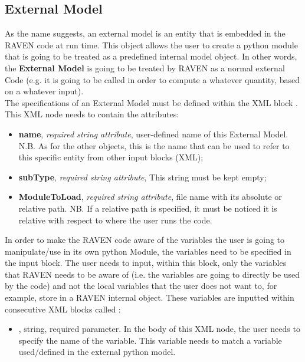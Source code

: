 \subsection{External Model}
\label{subsec:models_externalModel}
As the name suggests, an external model is an entity that is embedded in the
RAVEN code at run time.
%
This object allows the user to create a python module that is going to be
treated as a predefined internal model object.
%
In other words, the \textbf{External Model} is going to be treated by RAVEN as a
normal external Code (e.g. it is going to be called in order to compute a
whatever quantity, based on a whatever input).
%
\\The specifications of an External Model must be defined within the XML block
.
%
This XML node needs to contain the attributes:
\vspace{-5mm}
\begin{itemize}
  \itemsep0em
  \item \textbf{name}, \textit{required string attribute}, user-defined name of
  this External Model.
  N.B.
  As for the other objects, this is the name that can be used to refer to this
  specific entity from other input blocks (XML);
  \item \textbf{subType}, \textit{required string attribute}, This string must
  be kept empty;
  \item \textbf{ModuleToLoad}, \textit{required string attribute}, file name
  with its absolute or relative path.
  NB.
  If a relative path is specified, it must be noticed it is relative with
  respect to where the user runs the code.
\end{itemize}
\vspace{-5mm}
In order to make the RAVEN code aware of the variables the user is going to
manipulate/use in its own python Module, the variables need to be specified in
the \textbf{} input block.
%
The user needs to input, within this block, only the variables that RAVEN needs
to be aware of (i.e. the variables are going to directly be used by the code)
and not the local variables that the user does not want to, for example, store
in a RAVEN internal object.
%
These variables are inputted within consecutive XML blocks called :
\begin{itemize}
  \item {}, string, required parameter.
  In the body of this XML node, the user needs to specify the name of the
  variable.
  This variable needs to match a variable used/defined in the external python
  model.
\end{itemize}
